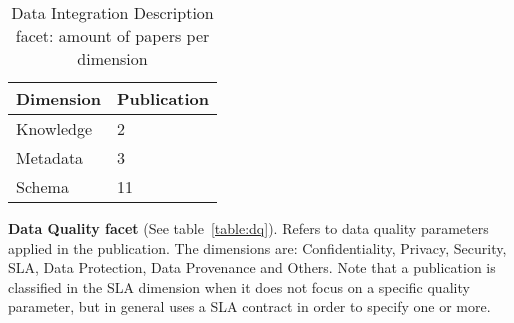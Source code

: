 \begin{table}[!h]
\begin{center}
\begin{tabular}{p{4cm}p{4cm}}
\hline 
\textbf{Dimension} & \textbf{Publication} \\ 
\hline 
Knowledge & 2 \\ 
\hline 
Metadata & 3 \\ 
\hline 
Schema & 11 \\ 
\hline 
\end{tabular}
\end{center}
\caption{Data Integration Description facet: amount of papers per dimension}\label{table:didesc}
\end{table}

\textbf{Data Quality facet} (See table~\ref{table:dq}). 
Refers to data quality parameters applied in the publication. 
The dimensions are: Confidentiality, Privacy, Security, SLA, Data Protection, Data Provenance and Others.
Note that a publication is classified in the SLA dimension when it does not focus on a specific quality parameter, but in general uses a SLA contract in order to specify one or more.

